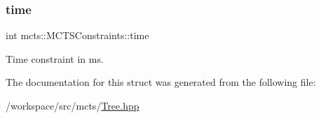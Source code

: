 \subsubsection{\texorpdfstring{time}{time}}
{\footnotesize\ttfamily int mcts\+::\+M\+C\+T\+S\+Constraints\+::time}



Time constraint in ms. 



The documentation for this struct was generated from the following file\+:\begin{DoxyCompactItemize}
\item 
/workspace/src/mcts/\hyperlink{_tree_8hpp}{Tree.\+hpp}\end{DoxyCompactItemize}
